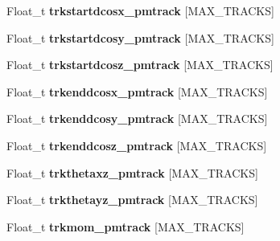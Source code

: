 \begin{DoxyCompactItemize}
\item 
\hypertarget{classanatree_a947165a91b8bda0981d75d230094e253}{Float\-\_\-t {\bfseries trkstartdcosx\-\_\-pmtrack} \mbox{[}M\-A\-X\-\_\-\-T\-R\-A\-C\-K\-S\mbox{]}}\label{classanatree_a947165a91b8bda0981d75d230094e253}

\item 
\hypertarget{classanatree_aa6a223461862a75581054d6c5e139a17}{Float\-\_\-t {\bfseries trkstartdcosy\-\_\-pmtrack} \mbox{[}M\-A\-X\-\_\-\-T\-R\-A\-C\-K\-S\mbox{]}}\label{classanatree_aa6a223461862a75581054d6c5e139a17}

\item 
\hypertarget{classanatree_aeb6ed771022d17477ea745f1200225b0}{Float\-\_\-t {\bfseries trkstartdcosz\-\_\-pmtrack} \mbox{[}M\-A\-X\-\_\-\-T\-R\-A\-C\-K\-S\mbox{]}}\label{classanatree_aeb6ed771022d17477ea745f1200225b0}

\item 
\hypertarget{classanatree_a372b3e3b4c13ac95a3c79db5ae540d41}{Float\-\_\-t {\bfseries trkenddcosx\-\_\-pmtrack} \mbox{[}M\-A\-X\-\_\-\-T\-R\-A\-C\-K\-S\mbox{]}}\label{classanatree_a372b3e3b4c13ac95a3c79db5ae540d41}

\item 
\hypertarget{classanatree_a2688fec0a4bdc0ee2f671c6f250f4e93}{Float\-\_\-t {\bfseries trkenddcosy\-\_\-pmtrack} \mbox{[}M\-A\-X\-\_\-\-T\-R\-A\-C\-K\-S\mbox{]}}\label{classanatree_a2688fec0a4bdc0ee2f671c6f250f4e93}

\item 
\hypertarget{classanatree_afa667756a208ba832a307f4dd45db168}{Float\-\_\-t {\bfseries trkenddcosz\-\_\-pmtrack} \mbox{[}M\-A\-X\-\_\-\-T\-R\-A\-C\-K\-S\mbox{]}}\label{classanatree_afa667756a208ba832a307f4dd45db168}

\item 
\hypertarget{classanatree_a976b72db54353c14cc663e2c23fff806}{Float\-\_\-t {\bfseries trkthetaxz\-\_\-pmtrack} \mbox{[}M\-A\-X\-\_\-\-T\-R\-A\-C\-K\-S\mbox{]}}\label{classanatree_a976b72db54353c14cc663e2c23fff806}

\item 
\hypertarget{classanatree_ade5e722b3626309af50f9d112f0dff5c}{Float\-\_\-t {\bfseries trkthetayz\-\_\-pmtrack} \mbox{[}M\-A\-X\-\_\-\-T\-R\-A\-C\-K\-S\mbox{]}}\label{classanatree_ade5e722b3626309af50f9d112f0dff5c}

\item 
\hypertarget{classanatree_aa411c306205f8e3b6663ab34685f2c38}{Float\-\_\-t {\bfseries trkmom\-\_\-pmtrack} \mbox{[}M\-A\-X\-\_\-\-T\-R\-A\-C\-K\-S\mbox{]}}\label{classanatree_aa411c306205f8e3b6663ab34685f2c38}


\end{DoxyCompactItemize}
